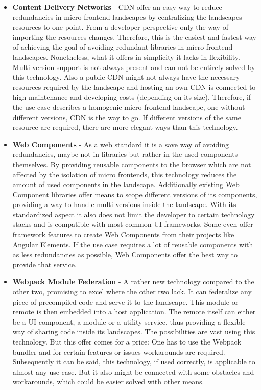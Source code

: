 \begin{itemize}
	\item \textbf{Content Delivery Networks} - CDN offer an easy way to reduce redundancies in micro frontend landscapes by centralizing the landscapes resources to one point. From a developer-perspective only the way of importing the resources changes. Therefore, this is the easiest and fastest way of achieving the goal of avoiding redundant libraries in micro frontend landscapes. Nonetheless, what it offers in simplicity it lacks in flexibility. Multi-version support is not always present and can not be entirely solved by this technology. Also a public CDN might not always have the necessary resources required by the landscape and hosting an own CDN is connected to high maintenance and developing costs (depending on its size). Therefore, if the use case describes a homogenic micro frontend landscape, one without different versions, CDN is the way to go. If different versions of the same resource are required, there are more elegant ways than this technology.
	
	\item \textbf{Web Components} - As a web standard it is a save way of avoiding redundancies, maybe not in libraries but rather in the used components themselves. By providing reusable components to the browser which are not affected by the isolation of micro frontends, this technology reduces the amount of used components in the landscape. Additionally existing Web Component libraries offer means to scope different versions of its components, providing a way to handle multi-versions inside the landscape. With its standardized aspect it also does not limit the developer to certain technology stacks and is compatible with most common UI frameworks. Some even offer framework features to create Web Components from their projects like Angular Elements. If the use case requires a lot of reusable components with as less redundancies as possible, Web Components offer the best way to provide that service.
	
	\item \textbf{Webpack Module Federation} - A rather new technology compared to the other two, promising to excel where the other two lack. It can federalize any piece of precompiled code and serve it to the landscape. This module or remote is then embedded into a host application. The remote itself can either be a UI component, a module or a utility service, thus providing a flexible way of sharing code inside its landscapes. The possibilities are vast using this technology. But this offer comes for a price: One has to use the Webpack bundler and for certain features or issues workarounds are required. 
	Subsequently it can be said, this technology, if used correctly, is applicable to almost any use case. But it also might be connected with some obstacles and workarounds, which could be easier solved with other means. 
\end{itemize}

